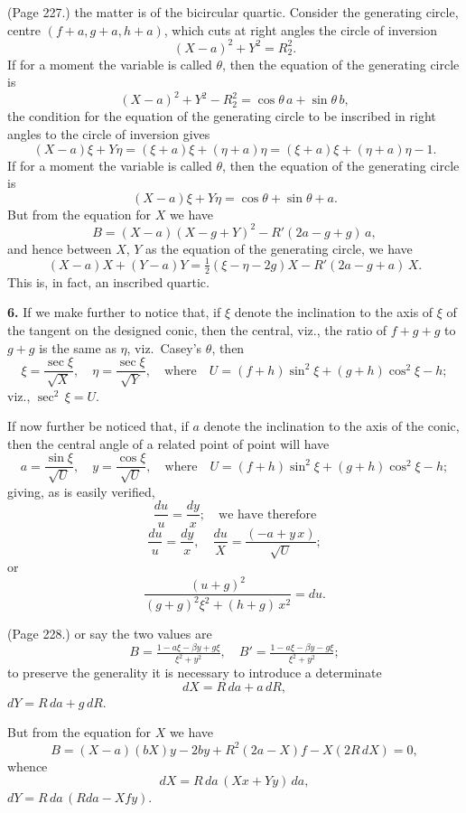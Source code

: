 \documentclass[11pt,a4paper]{article}
\theoremstyle{plain}
\theoremstyle{definition}
\begin{document}
\medskip

\noindent (Page 227.) the matter is of the bicircular quartic. Consider the generating circle, centre $(f + a, g + a, h + a)$, which cuts at right angles the circle of inversion
\[
(X - a)^2 + Y^2 = R_2^2.
\]
If for a moment the variable is called $\theta$, then the equation of the generating circle is
\[
(X - a)^2 + Y^2 - R_2^2 = \cos\theta\,a + \sin\theta\,b,
\]
the condition for the equation of the generating circle to be inscribed in right angles to the circle of inversion gives
\[
(X - a)\xi + Y\eta = (\xi + a)\xi + (\eta + a)\eta = (\xi + a)\xi + (\eta + a)\eta - 1.
\]
If for a moment the variable is called $\theta$, then the equation of the generating circle is
\[
(X - a)\xi + Y\eta = \cos\theta + \sin\theta + a.
\]
But from the equation for $X$ we have
\[
B = (X - a) (X - g + Y)^2 - R'(2 a - g + g)\,a,
\]
and hence between $X$, $Y$ as the equation of the generating circle, we have
\[
(X - a) X + (Y - a) Y = \tfrac{1}{2}(\xi - \eta - 2 g) X - R'(2 a - g + a)\,X.
\]
This is, in fact, an inscribed quartic.

\medskip

\noindent\textbf{6.} If we make further to notice that, if $\xi$ denote the inclination to the axis of $\xi$ of the tangent on the designed conic, then the central, viz., the ratio of $f + g + g$ to $g + g$ is the same as $\eta$, viz.\ Casey's $\theta$, then
\[
\xi = \frac{\sec\xi}{\sqrt{X}}, \quad \eta = \frac{\sec\xi}{\sqrt{Y}}, \quad \text{where} \quad U = (f + h)\sin^2 \xi + (g + h)\cos^2\xi - h;
\]
viz., $\sec^2\,\xi = U$.

If now further be noticed that, if $a$ denote the inclination to the axis of the conic, then the central angle of a related point of point will have
\[
a = \frac{\sin\xi}{\sqrt{U}}, \quad y = \frac{\cos\xi}{\sqrt{U}}, \quad \text{where} \quad U = (f + h)\sin^2\xi + (g + h)\cos^2\xi - h;
\]
giving, as is easily verified,
\[
\frac{du}{u} = \frac{dy}{x}; \quad \text{we have therefore}
\]
\[
\frac{du}{u} = \frac{dy}{x},\quad \frac{du}{X} = \frac{(- a + y\,x)}{\sqrt{U}};
\]
or
\[
\frac{(u + g)^2}{(g + g)^2 \xi^2 + (h + g)\,x^2} = du.
\]

\medskip

\noindent (Page 228.) or say the two values are
\[
B = \tfrac{1 - a\xi - \beta y + g\xi}{\xi^2 + y^2}, \quad B' = \tfrac{1 - a\xi - \beta y - g\xi}{\xi^2 + y^2};
\]
to preserve the generality it is necessary to introduce a determinate
\[
dX = R\,da + a\,dR,
\]
$d Y = R\,d a + g\,d R$.

But from the equation for $X$ we have
\[
B = (X - a)(b X)y - 2 b y + R^2(2 a - X)f - X(2 R\,d X) = 0,
\]
whence
\[
dX = R\,da\,(Xx + Y y)\,da,
\]
$dY = R\,da\,(R d a - X f y)$.
\end{document}
